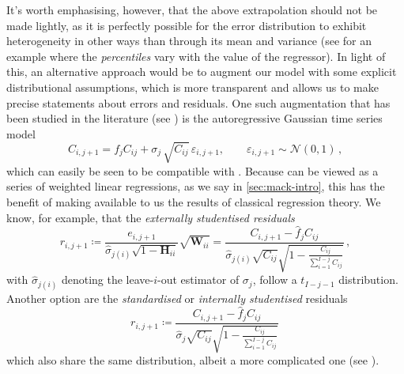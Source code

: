 \documentclass[a4paper]{book}
\begin{document}
It's worth emphasising, however, that the above extrapolation should not be made lightly, as it is perfectly possible for the error distribution to exhibit heterogeneity in other ways than through its mean and variance (see \cite[114]{efron:intro} for an example where the \emph{percentiles} vary with the value of the regressor). In light of this, an alternative approach would be to augment our model with some explicit distributional assumptions, which is more transparent and allows us to make precise statements about errors and residuals. One such augmentation that has been studied in the literature (see \cite[49]{wuthrich:stochastic-reserving}) is the autoregressive Gaussian time series model
\begin{equation} \label{eq:time-series-model}
  C_{i, j + 1} = f_j C_{ij} + \sigma_j \, \sqrt{C_{ij}} \, \varepsilon_{i, j + 1}, \qquad \varepsilon_{i, j + 1} \sim \mathcal{N}(0, 1) \,,
\end{equation}
which can easily be seen to be compatible with . Because  can be viewed as a series of weighted linear regressions, as we say in \cref{sec:mack-intro}, this has the benefit of making available to us the results of classical regression theory. We know, for example, that the \emph{externally studentised residuals}
\begin{equation}
  r_{i, j + 1}
  \coloneqq \frac{e_{i, j + 1}}{\widehat{\sigma}_{j (i)} \sqrt{1 - \mathbf{H}_{ii}}} \sqrt{\mathbf{W}_{ii}}
  = \frac{C_{i, j + 1} - \widehat{f}_j C_{ij}}{\widehat{\sigma}_{j (i)} \sqrt{C_{ij}} \sqrt{1 - \frac{C_{ij}}{\sum_{i = 1}^{I - j} C_{ij}}}} \,,
\end{equation}
with $\widehat{\sigma}_{j (i)}$ denoting the leave-$i$-out estimator of $\sigma_j$, follow a $t_{I - j - 1}$ distribution. Another option are the \emph{standardised} or \emph{internally studentised} residuals
\begin{equation}
  r_{i, j + 1} \coloneqq \frac{C_{i, j + 1} - \widehat{f}_j C_{ij}}{\widehat{\sigma}_j \sqrt{C_{ij}} \sqrt{1 - \frac{C_{ij}}{\sum_{i = 1}^{I - j} C_{ij}}}} \,
\end{equation}
which also share the same distribution, albeit a more complicated one (see \cite[267 \psqq]{seber}).
\end{document}
